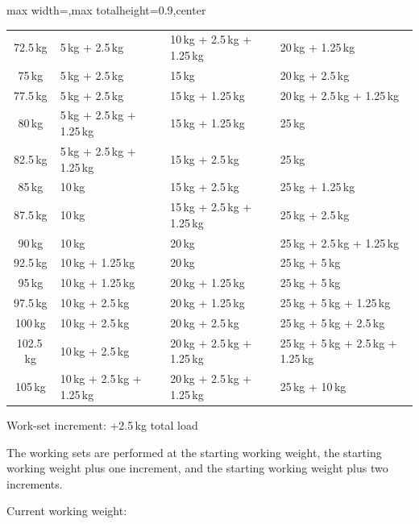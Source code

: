 \documentclass[11pt,a4paper]{article}
\begin{document}
\begin{center}
\begin{adjustbox}{max width=\linewidth,max totalheight=0.9\textheight,center}
\begin{tabular}{c p{4.3cm} p{4.3cm} p{4.3cm}}
72.5\,kg & 5\,kg + 2.5\,kg & 10\,kg + 2.5\,kg + 1.25\,kg & 20\,kg + 1.25\,kg \\
75\,kg   & 5\,kg + 2.5\,kg & 15\,kg & 20\,kg + 2.5\,kg \\
77.5\,kg & 5\,kg + 2.5\,kg & 15\,kg + 1.25\,kg & 20\,kg + 2.5\,kg + 1.25\,kg \\
80\,kg   & 5\,kg + 2.5\,kg + 1.25\,kg & 15\,kg + 1.25\,kg & 25\,kg \\
82.5\,kg & 5\,kg + 2.5\,kg + 1.25\,kg & 15\,kg + 2.5\,kg & 25\,kg \\
85\,kg   & 10\,kg & 15\,kg + 2.5\,kg & 25\,kg + 1.25\,kg \\
87.5\,kg & 10\,kg & 15\,kg + 2.5\,kg + 1.25\,kg & 25\,kg + 2.5\,kg \\
90\,kg   & 10\,kg & 20\,kg & 25\,kg + 2.5\,kg + 1.25\,kg \\
92.5\,kg & 10\,kg + 1.25\,kg & 20\,kg & 25\,kg + 5\,kg \\
95\,kg   & 10\,kg + 1.25\,kg & 20\,kg + 1.25\,kg & 25\,kg + 5\,kg \\
97.5\,kg & 10\,kg + 2.5\,kg & 20\,kg + 1.25\,kg & 25\,kg + 5\,kg + 1.25\,kg \\
100\,kg  & 10\,kg + 2.5\,kg & 20\,kg + 2.5\,kg & 25\,kg + 5\,kg + 2.5\,kg \\
102.5\,kg & 10\,kg + 2.5\,kg & 20\,kg + 2.5\,kg + 1.25\,kg & 25\,kg + 5\,kg + 2.5\,kg + 1.25\,kg \\
105\,kg  & 10\,kg + 2.5\,kg + 1.25\,kg & 20\,kg + 2.5\,kg + 1.25\,kg & 25\,kg + 10\,kg \\
\bottomrule
\end{tabular}
\end{adjustbox}
\renewcommand{\arraystretch}{1}
\end{center}

Work-set increment: +2.5\,kg total load

The working sets are performed at the starting working weight, the starting working weight plus one increment, and the starting working weight plus two increments.

Current working weight:
\end{document}
